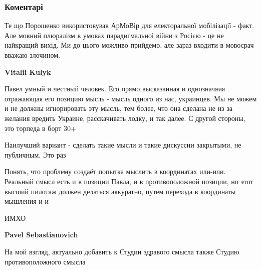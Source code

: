  
 
 
 
 
\subsubsection{Коментарі}
\label{sec:31_08_2021.fb.kulik_vitalij.1.pro_movu_i_ne_tilky.cmt}

\begin{itemize}

Те що Порошенко використовував АрМоВір для електоральної мобілізації - факт.
Але мовний плюралізм в умовах парадигмальноі війни з Росією - це не найкращий
вихід. Ми до цього можливо прийдемо, але зараз входити в мовосрач вважаю
злочином.

\begin{itemize}
 
\textbf{Vitalii Kulyk} 

Павел умный и честный человек. Его прямо высказанная и однозначная отражающая
его позицию мысль - мысль одного из нас, украинцев. Мы не можем и не должны
игнорировать эту мысль, тем более, что она сделана не из за желания вредить
Украине, расскачивать лодку, и так далее. С другой стороны, это торпеда в борт
30+

Наилучший вариант - сделать такие мысли и такие дискуссии закрытыми, не
публичным. Это раз

Понять, что проблему создаёт попытка мыслить в координатах или-или. Реальный
смысл есть и в позиции Павла, и в противоположной позиции, но этот высший
пилотаж должен делаться аккуратно, путем перехода в координаты мышления и-и

ИМХО


\textbf{Pavel Sebastianovich} 

На мой взгляд, актуально добавить к Студии здравого смысла также Студию
противоположного смысла


\end{itemize}
\end{itemize}
